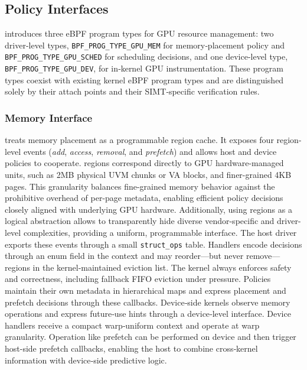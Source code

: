 \subsection{\sys{} Policy Interfaces}
\label{sec:design-interfaces}

\sys introduces three eBPF program types for GPU resource management: two driver‑level types, \texttt{BPF\_PROG\_TYPE\_GPU\_MEM} for memory‑placement policy and \texttt{BPF\_PROG\_TYPE\_GPU\_SCHED} for scheduling decisions, and one device‑level type, \texttt{BPF\_PROG\_TYPE\_GPU\_DEV}, for in‑kernel GPU instrumentation. These program types coexist with existing kernel eBPF program types and are distinguished solely by their attach points and their SIMT‑specific verification rules.

\subsubsection{Memory Interface}
\label{sec:design-mem}

\sys treats memory placement as a programmable region cache. It exposes four region-level events (\emph{add}, \emph{access}, \emph{removal}, and \emph{prefetch}) and allows host and device policies to cooperate. \sys regions correspond directly to GPU hardware-managed units, such as 2MB physical UVM chunks or VA blocks, and finer-grained 4KB pages. This granularity balances fine-grained memory behavior against the prohibitive overhead of per-page metadata, enabling efficient policy decisions closely aligned with underlying GPU hardware. Additionally, using regions as a logical abstraction allows \sys to transparently hide diverse vendor-specific and driver-level complexities, providing a uniform, programmable interface. The host driver exports these events through a small \texttt{struct\_ops} table. Handlers encode decisions through an enum field in the context and may reorder—but never remove—regions in the kernel‑maintained eviction list. The kernel always enforces safety and correctness, including fallback FIFO eviction under pressure. Policies maintain their own metadata in hierarchical maps and express placement and prefetch decisions through these callbacks. Device‑side kernels observe memory operations and express future‑use hints through a device‑level interface. Device handlers receive a compact warp‑uniform context and operate at warp granularity. Operation like prefetch can be performed on device and then trigger host-side prefetch callbacks, enabling the host to combine cross‑kernel information with device‑side predictive logic.


